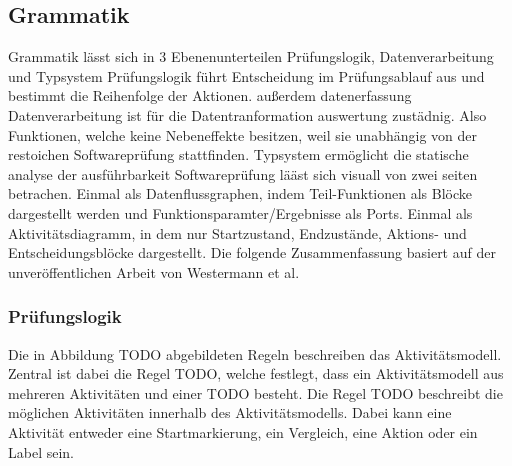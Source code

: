 \documentclass{article}
\begin{document}
    \subsection{Grammatik}
    \label{BNF}
    Grammatik lässt sich in 3 Ebenenunterteilen Prüfungslogik, Datenverarbeitung und Typsystem
    Prüfungslogik führt Entscheidung im Prüfungsablauf aus und bestimmt die Reihenfolge der Aktionen. außerdem datenerfassung
    Datenverarbeitung ist für die Datentranformation auswertung zustädnig. Also Funktionen, welche keine Nebeneffekte besitzen, weil sie unabhängig von der restoichen Softwareprüfung stattfinden.
    Typsystem ermöglicht die statische analyse der ausführbarkeit
    Softwareprüfung lääst sich visuall von zwei seiten betrachen. 
    Einmal als Datenflussgraphen, indem Teil-Funktionen als Blöcke dargestellt werden und Funktionsparamter/Ergebnisse als Ports.
    Einmal als Aktivitätsdiagramm, in dem nur Startzustand, Endzustände, Aktions- und Entscheidungsblöcke dargestellt.
    Die folgende Zusammenfassung basiert auf der unveröffentlichen Arbeit von Westermann et al.
    
    \subsubsection{Prüfungslogik}
    Die in Abbildung TODO abgebildeten Regeln beschreiben das Aktivitätsmodell.
    Zentral ist dabei die Regel TODO, welche festlegt, dass ein Aktivitätsmodell aus mehreren Aktivitäten und einer TODO besteht.
    Die Regel TODO beschreibt die möglichen Aktivitäten innerhalb des Aktivitätsmodells. Dabei kann eine Aktivität entweder eine Startmarkierung, ein Vergleich, eine Aktion oder ein Label sein.
    
\end{document}
